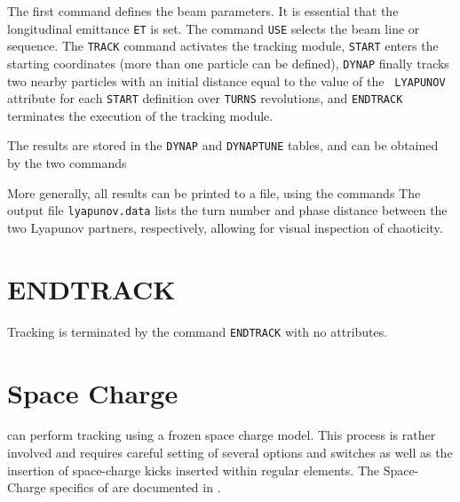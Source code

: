 
The first command defines the beam parameters. It is  essential that the
longitudinal emittance \texttt{ET} is set. The command \texttt{USE}
selects the beam line or sequence. The \texttt{TRACK} command activates the
tracking module, \texttt{START} enters the starting coordinates (more
than one particle can be defined),  \texttt{DYNAP} finally tracks two
nearby particles  with an initial distance equal to the value of the \texttt{
LYAPUNOV} attribute  for each
\texttt{START} definition over \texttt{TURNS} revolutions, and
\texttt{ENDTRACK} terminates the execution of the tracking module. 

The results are stored in the \texttt{DYNAP} and \texttt{DYNAPTUNE}
tables, and can be obtained by the two commands  
 

More generally, all results can be printed to a file, using the commands 
The output file \texttt{lyapunov.data} lists the turn number and phase
distance between the two Lyapunov partners, respectively, allowing for
visual inspection of chaoticity.
 
\section{ENDTRACK}
\label{sec:endtrack}

Tracking is terminated by the command \texttt{ENDTRACK} with no
attributes. 


\section{Space Charge}

\madx can perform tracking using a frozen space charge model.
This process is rather involved and requires careful setting of several options 
and switches as well as the insertion of space-charge kicks inserted within 
regular elements. The Space-Charge specifics of \madx are documented in 
\cite{kapin2013}.


